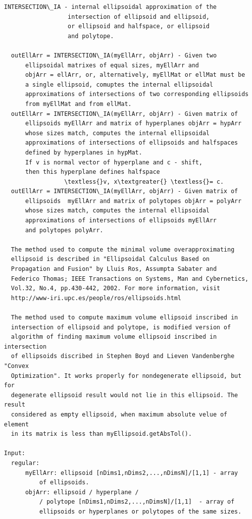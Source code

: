 \documentclass[letterpaper,10pt,english]{sphinxmanual}
\begin{document}
\begin{Verbatim}[commandchars=\\\{\}]
INTERSECTION\_IA - internal ellipsoidal approximation of the
                  intersection of ellipsoid and ellipsoid,
                  or ellipsoid and halfspace, or ellipsoid
                  and polytope.

  outEllArr = INTERSECTION\_IA(myEllArr, objArr) - Given two
      ellipsoidal matrixes of equal sizes, myEllArr and
      objArr = ellArr, or, alternatively, myEllMat or ellMat must be
      a single ellipsoid, comuptes the internal ellipsoidal
      approximations of intersections of two corresponding ellipsoids
      from myEllMat and from ellMat.
  outEllArr = INTERSECTION\_IA(myEllArr, objArr) - Given matrix of
      ellipsoids myEllArr and matrix of hyperplanes objArr = hypArr
      whose sizes match, computes the internal ellipsoidal
      approximations of intersections of ellipsoids and halfspaces
      defined by hyperplanes in hypMat.
      If v is normal vector of hyperplane and c - shift,
      then this hyperplane defines halfspace
                 \textless{}v, x\textgreater{} \textless{}= c.
  outEllArr = INTERSECTION\_IA(myEllArr, objArr) - Given matrix of
      ellipsoids  myEllArr and matrix of polytopes objArr = polyArr
      whose sizes match, computes the internal ellipsoidal
      approximations of intersections of ellipsoids myEllArr
      and polytopes polyArr.

  The method used to compute the minimal volume overapproximating
  ellipsoid is described in "Ellipsoidal Calculus Based on
  Propagation and Fusion" by Lluis Ros, Assumpta Sabater and
  Federico Thomas; IEEE Transactions on Systems, Man and Cybernetics,
  Vol.32, No.4, pp.430-442, 2002. For more information, visit
  http://www-iri.upc.es/people/ros/ellipsoids.html

  The method used to compute maximum volume ellipsoid inscribed in
  intersection of ellipsoid and polytope, is modified version of
  algorithm of finding maximum volume ellipsoid inscribed in intersection
  of ellipsoids discribed in Stephen Boyd and Lieven Vandenberghe "Convex
  Optimization". It works properly for nondegenerate ellipsoid, but for
  degenerate ellipsoid result would not lie in this ellipsoid. The result
  considered as empty ellipsoid, when maximum absolute velue of element
  in its matrix is less than myEllipsoid.getAbsTol().

Input:
  regular:
      myEllArr: ellipsoid [nDims1,nDims2,...,nDimsN]/[1,1] - array
          of ellipsoids.
      objArr: ellipsoid / hyperplane /
          / polytope [nDims1,nDims2,...,nDimsN]/[1,1]  - array of
          ellipsoids or hyperplanes or polytopes of the same sizes.


\end{Verbatim}
\end{document}
